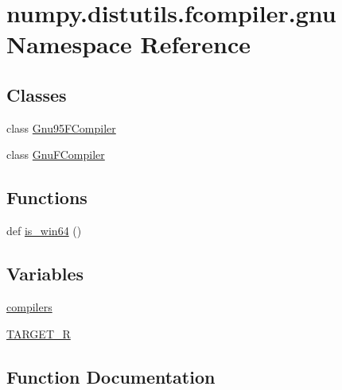 \hypertarget{namespacenumpy_1_1distutils_1_1fcompiler_1_1gnu}{}\section{numpy.\+distutils.\+fcompiler.\+gnu Namespace Reference}
\label{namespacenumpy_1_1distutils_1_1fcompiler_1_1gnu}
\subsection*{Classes}
\begin{DoxyCompactItemize}
\item 
class \hyperlink{classnumpy_1_1distutils_1_1fcompiler_1_1gnu_1_1Gnu95FCompiler}{Gnu95\+F\+Compiler}
\item 
class \hyperlink{classnumpy_1_1distutils_1_1fcompiler_1_1gnu_1_1GnuFCompiler}{Gnu\+F\+Compiler}
\end{DoxyCompactItemize}
\subsection*{Functions}
\begin{DoxyCompactItemize}
\item 
def \hyperlink{namespacenumpy_1_1distutils_1_1fcompiler_1_1gnu_aa046459467a251c6e078a9bd165da131}{is\+\_\+win64} ()
\end{DoxyCompactItemize}
\subsection*{Variables}
\begin{DoxyCompactItemize}
\item 
\hyperlink{namespacenumpy_1_1distutils_1_1fcompiler_1_1gnu_acd2cd217b8cc9e6dae322a0047eec5b4}{compilers}
\item 
\hyperlink{namespacenumpy_1_1distutils_1_1fcompiler_1_1gnu_a5222fc251d17043e65923c6503bb5fe4}{T\+A\+R\+G\+E\+T\+\_\+R}
\end{DoxyCompactItemize}


\subsection{Function Documentation}
\mbox{\label{namespacenumpy_1_1distutils_1_1fcompiler_1_1gnu_aa046459467a251c6e078a9bd165da131}} 
